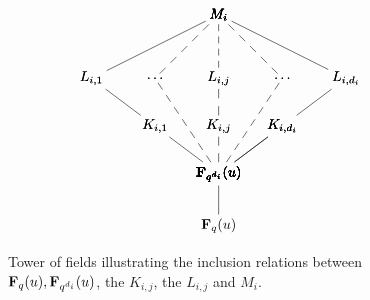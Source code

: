 \documentclass[a4paper]{compositio}
\begin{document}
\begin{figure}\[
\xy
 (0,0)*+{\F_{q^{d_i}}(u)};(16,12)*+{K_{i,d_i}}**\dir{-};
(-16,12)*+{K_{i,1}};(-32,24)*+{L_{i,1}}**\dir{-};
(16,12)*+{K_{i,d_i}};(32,24)*+{L_{i,d_i}}**\dir{-};
(0,-13)*+{\F_{q}(u)};(0,0)*+{\F_{q^{d_i}}(u)}**\dir{-};
(-16,12)*+{K_{i,1}}**\dir{-};(0,0)*+{\F_{q^{d_i}}(u)};(16,12)*+{K_{i,d_i}}**\dir{-};(0,0)*+{\F_{q^{d_i}}(u)};
(-32,24)*+{L_{i,1}};(0,40)*+{M_i}**\dir{-};
(32,24)*+{L_{i,d_i}};(0,40)*+{M_i}**\dir{-};
(0,0)*+{\F_{q^{d_i}}(u)};(-16,24)*+{\dots}**\dir{--};
(0,0)*+{\F_{q^{d_i}}(u)};(16,24)*+{\dots}**\dir{--};
(-16,24)*+{\dots};(0,40)*+{M_i}**\dir{--};(0,0)*+{\F_{q^{d_i}}(u)};(0,12)*+{K_{i,j}}**\dir{--};
(0,12)*+{K_{i,j}};(0,24)*+{L_{i,j}}**\dir{--};
(0,24)*+{L_{i,j}};(0,40)*+{M_i}**\dir{--};
(16,24)*+{\dots};(0,40)*+{M_i}**\dir{--};
\endxy
\]
\caption{Tower of fields illustrating the inclusion relations
between $\mathbf{F}_{q}(u), \mathbf{F}_{q^{d_i}}(u)$, the $K_{i,j}$, the $L_{i,j}$
and $M_i$.\label{fig:tower} }
\end{figure}
\end{document}
